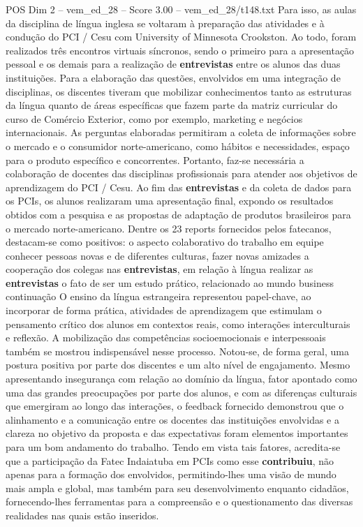 \begin{textsample}{POS Dim 2 – vem\_ed\_28 – Score 3.00 – vem\_ed\_28/t148.txt}
Para isso, as aulas da disciplina de língua inglesa se voltaram à preparação das atividades e à condução do PCI / Cesu com University of Minnesota Crookston.
Ao todo, foram realizados três encontros virtuais síncronos, sendo o primeiro para a apresentação pessoal e os demais para a realização de \textbf{entrevistas} entre os alunos das duas instituições.
Para a elaboração das questões, envolvidos em uma integração de disciplinas, os discentes tiveram que mobilizar conhecimentos tanto as estruturas da língua quanto de áreas específicas que fazem parte da matriz curricular do curso de Comércio Exterior, como por exemplo, marketing e negócios internacionais.
As perguntas elaboradas permitiram a coleta de informações sobre o mercado e o consumidor norte-americano, como hábitos e necessidades, espaço para o produto específico e concorrentes.
Portanto, faz-se necessária a colaboração de docentes das disciplinas profissionais para atender aos objetivos de aprendizagem do PCI / Cesu.
Ao fim das \textbf{entrevistas} e da coleta de dados para os PCIs, os alunos realizaram uma apresentação final, expondo os resultados obtidos com a pesquisa e as propostas de adaptação de produtos brasileiros para o mercado norte-americano.
Dentre os 23 reports fornecidos pelos fatecanos, destacam-se como positivos: o aspecto colaborativo do trabalho em equipe conhecer pessoas novas e de diferentes culturas, fazer novas amizades a cooperação dos colegas nas \textbf{entrevistas}, em relação à língua realizar as \textbf{entrevistas} o fato de ser um estudo prático, relacionado ao mundo business continuação O ensino da língua estrangeira representou papel-chave, ao incorporar de forma prática, atividades de aprendizagem que estimulam o pensamento crítico dos alunos em contextos reais, como interações interculturais e reflexão.
A mobilização das competências socioemocionais e interpessoais também se mostrou indispensável nesse processo.
Notou-se, de forma geral, uma postura positiva por parte dos discentes e um alto nível de engajamento.
Mesmo apresentando insegurança com relação ao domínio da língua, fator apontado como uma das grandes preocupações por parte dos alunos, e com as diferenças culturais que emergiram ao longo das interações, o feedback fornecido demonstrou que o alinhamento e a comunicação entre os docentes das instituições envolvidas e a clareza no objetivo da proposta e das expectativas foram elementos importantes para um bom andamento do trabalho.
Tendo em vista tais fatores, acredita-se que a participação da Fatec Indaiatuba em PCIs como esse \textbf{contribuiu}, não apenas para a formação dos envolvidos, permitindo-lhes uma visão de mundo mais ampla e global, mas também para seu desenvolvimento enquanto cidadãos, fornecendo-lhes ferramentas para a compreensão e o questionamento das diversas realidades nas quais estão inseridos.

\end{textsample}
